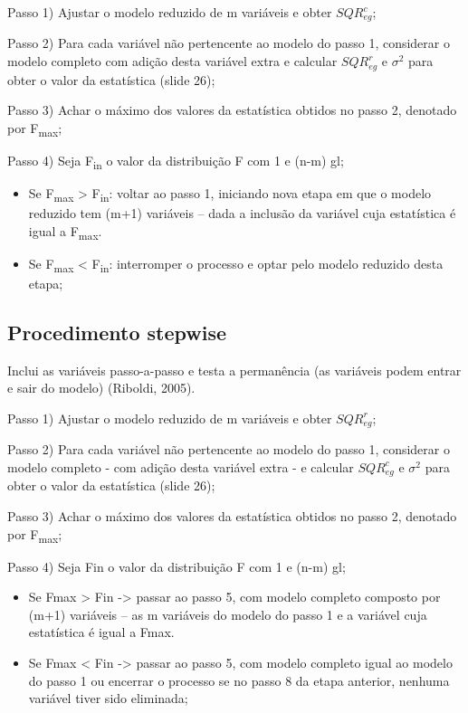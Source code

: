 \documentclass[12pt,brazil,oneside]{book}
\begin{document}
Passo 1) Ajustar o modelo reduzido de m variáveis e obter \(SQR^{c}_{eg}\);

Passo 2) Para cada variável não pertencente ao modelo do passo 1, considerar o modelo completo com adição desta variável
extra e calcular \(SQR^{r}_{eg}\) e \(\sigma^{2}\) para obter o valor da estatística (slide 26);

Passo 3) Achar o máximo dos valores da estatística obtidos no passo 2, denotado por F\textsubscript{max};

Passo 4) Seja F\textsubscript{in} o valor da distribuição F com 1 e (n-m) gl;

\begin{itemize}
\item
  Se F\textsubscript{max} \textgreater{} F\textsubscript{in}: voltar ao passo 1, iniciando nova etapa em que o modelo reduzido tem (m+1) variáveis -- dada a inclusão
  da variável cuja estatística é igual a F\textsubscript{max}.
\item
  Se F\textsubscript{max} \textless{} F\textsubscript{in}: interromper o processo e optar pelo modelo reduzido desta etapa;
\end{itemize}

\hypertarget{procedimento-stepwise}{%
\subsection{Procedimento stepwise}\label{procedimento-stepwise}}

Inclui as variáveis passo-a-passo e testa a permanência (as variáveis podem entrar e sair do modelo) (Riboldi, 2005).

Passo 1) Ajustar o modelo reduzido de m variáveis e obter \(SQR^{r}_{eg}\);

Passo 2) Para cada variável não pertencente ao modelo do passo 1, considerar o modelo completo - com adição desta variável
extra - e calcular \(SQR^{c}_{eg}\) e \(\sigma^{2}\) para obter o valor da estatística (slide 26);

Passo 3) Achar o máximo dos valores da estatística obtidos no passo 2, denotado por F\textsubscript{max};

Passo 4) Seja Fin o valor da distribuição F com 1 e (n-m) gl;

\begin{itemize}
\item
  Se Fmax \textgreater{} Fin -\textgreater{} passar ao passo 5, com modelo completo composto por (m+1) variáveis -- as m variáveis do modelo do
  passo 1 e a variável cuja estatística é igual a Fmax.
\item
  Se Fmax \textless{} Fin -\textgreater{} passar ao passo 5, com modelo completo igual ao modelo do passo 1 ou encerrar o processo se no passo
  8 da etapa anterior, nenhuma variável tiver sido eliminada;
\end{itemize}
\end{document}
